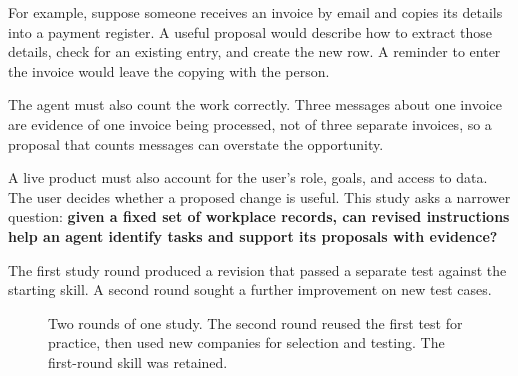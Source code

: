\documentclass[11pt]{article}
\begin{document}
For example, suppose someone receives an invoice by email and copies its details into a payment register. A useful proposal would describe how to extract those details, check for an existing entry, and create the new row. A reminder to enter the invoice would leave the copying with the person.

The agent must also count the work correctly. Three messages about one invoice are evidence of one invoice being processed, not of three separate invoices, so a proposal that counts messages can overstate the opportunity.

A live product must also account for the user's role, goals, and access to data. The user decides whether a proposed change is useful. This study asks a narrower question: \textbf{given a fixed set of workplace records, can revised instructions help an agent identify tasks and support its proposals with evidence?}

The first study round produced a revision that passed a separate test against the starting skill. A second round sought a further improvement on new test cases.

\begin{figure}[htbp]
\centering
{}
\caption{Two rounds of one study. The second round reused the first test for practice, then used new companies for selection and testing. The first-round skill was retained.}
\end{figure}
\end{document}
